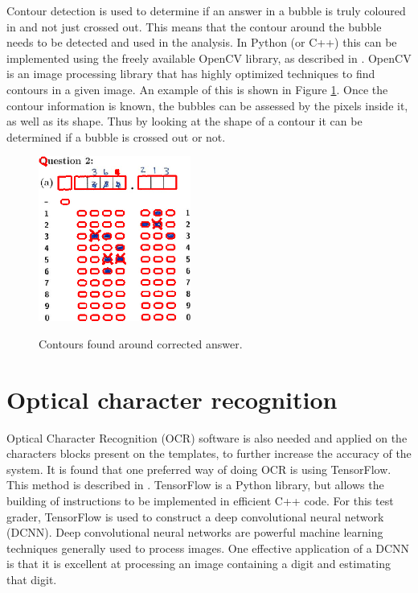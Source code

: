 Contour detection is used to determine if an answer in a bubble is truly coloured in and not just crossed out. This means that the contour around the bubble needs to be detected and used in the analysis. In Python (or C++) this can be implemented using the freely available OpenCV library, as described in \citet{AdrianR2016}. OpenCV is an image processing library that has highly optimized techniques to find contours in a given image. An example of this is shown in Figure \ref{fig:Cross}. Once the contour information is known, the bubbles can be assessed by the pixels inside it, as well as its shape. Thus by looking at the shape of a contour it can be determined if a bubble is crossed out or not.
\begin{figure}
  \centering
  \includegraphics[width=5cm]{Cross}\\
  \caption{Contours found around corrected answer.}
  \label{fig:Cross}
\end{figure}

\section{Optical character recognition}
Optical Character Recognition (OCR) software is also needed and applied on the characters blocks present on the templates, to further increase the accuracy of the system. It is found that one preferred way of doing OCR is using TensorFlow. This method is described in \citet{Tensor}. TensorFlow is a Python library, but allows the building of instructions to be implemented in ef{f}icient C++ code. For this test grader, TensorFlow is used to construct a deep convolutional neural network (DCNN). Deep convolutional neural networks are powerful machine learning techniques generally used to process images. One effective application of a DCNN is that it is excellent at processing an image containing a digit and estimating that digit.

